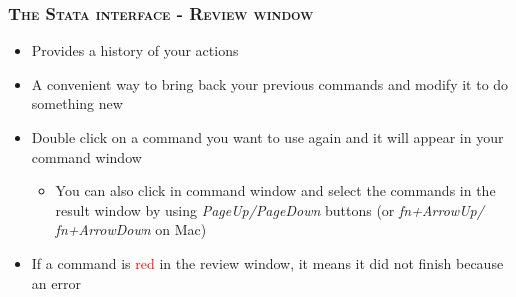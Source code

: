 \documentclass[10pt]{beamer}
\begin{document}
	\begin{frame}

		\frametitle{\textsc{The Stata interface - Review window}}
			\begin{center}
				\Large \textbf{} 
			\end{center}
		\begin{itemize}
			\item  Provides a history of your actions
			\item  A convenient way to bring back your previous commands and modify it to do something new
			\item Double click on a command you want to use again and it will appear in your command window
			\begin{itemize}
				\item You can also click in command window and select the commands in the result window by using \textit{PageUp/PageDown} buttons (or \textit{fn+ArrowUp/ fn+ArrowDown} on Mac)
			\end{itemize}
			\item If a command is \textcolor{red}{red} in the review window, it means it did not finish because an error
		\end{itemize}
	\end{frame}
\end{document}
